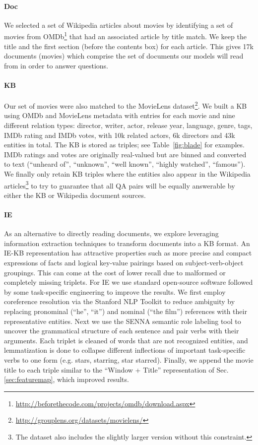 \documentclass[11pt,letterpaper]{article}
\begin{document}
\paragraph{Doc}
We selected a set of Wikipedia articles about movies
by identifying a set of movies from OMDb\footnote{\tiny{\url{http://beforethecode.com/projects/omdb/download.aspx}}}
that had an associated article by title match.
We keep the title and the first section (before the contents box) for each article.
This gives 17k documents (movies) which comprise the set of documents our
models will read from in order to answer questions.

\paragraph{KB}
Our set of movies were also matched to
the MovieLens dataset\footnote{\tiny{\url{http://grouplens.org/datasets/movielens/}}}.
We built a KB using OMDb and MovieLens metadata with entries for each movie and nine different relation types:
director, writer, actor, release year, language, genre, tags, IMDb rating and IMDb votes,
with 10k related actors, 6k directors and
43k  entities in total.
The KB is stored as triples; see Table~\ref{fig:blade} for examples.
IMDb ratings and votes
are originally real-valued but are binned and converted to text
 (``unheard of'', ``unknown'', ``well known'', ``highly watched'', ``famous'').
We finally only retain KB triples where the entities also appear in the Wikipedia
articles\footnote{The dataset also
includes the slightly larger version without this constraint.}
to try to
guarantee that all QA pairs will be equally answerable by either the KB or Wikipedia document
sources.

\paragraph{IE} As an alternative to directly reading documents,
we explore leveraging information extraction  techniques to
transform documents into a KB format.
An IE-KB representation has attractive properties
such as more precise and compact expressions of facts
and logical key-value pairings based on subject-verb-object groupings.
This can come at the cost of lower recall due to malformed or completely missing triplets.
For IE we use standard open-source software followed by some task-specific
engineering to improve the results.
We first employ coreference resolution via the Stanford NLP Toolkit \citep{manning2014stanford} to reduce ambiguity by replacing pronominal (``he'', ``it'') and nominal (``the film'') references with their representative entities. Next we use the SENNA semantic role labeling tool \citep{senna_collobert} to uncover the grammatical structure of each sentence and pair verbs with their arguments. Each triplet is cleaned of words that are not recognized entities,
and lemmatization is done to collapse different inflections of important task-specific verbs to one form (e.g. stars, starring, star  starred).
Finally, we append the movie title to each triple similar to the ``Window + Title''
representation of Sec. \ref{sec:featuremap}, which improved results.
\end{document}
